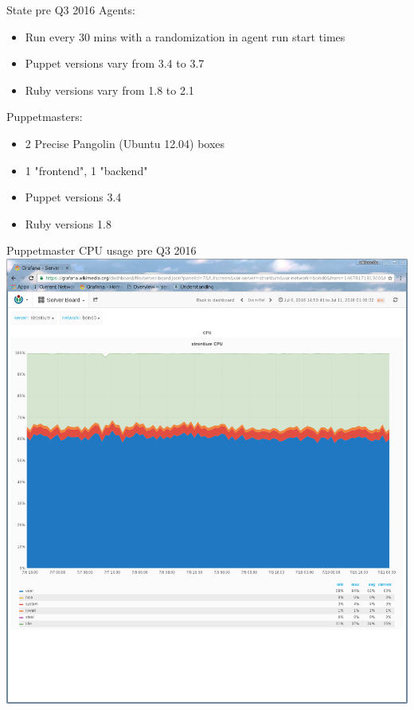 \documentclass{beamer}
\begin{document}
    \begin{frame}{State pre Q3 2016}
        Agents:
        \begin{itemize}
        \pause \item Run every 30 mins with a randomization in agent run start times
        \pause \item Puppet versions vary from 3.4 to 3.7
        \pause \item Ruby versions vary from 1.8 to 2.1
        \end{itemize}
        \pause Puppetmasters:
        \begin{itemize}
            \pause \item 2 Precise Pangolin (Ubuntu 12.04) boxes
            \pause \item 1 "frontend", 1 "backend"
            \pause \item Puppet versions 3.4
            \pause \item Ruby versions 1.8
        \end{itemize}
    \end{frame}
    \begin{frame}{Puppetmaster CPU usage pre Q3 2016}
        \includegraphics[width=\textwidth, height=\textheight]{cpu_usage_pre_q3_2016.png}
    \end{frame}
\end{document}
